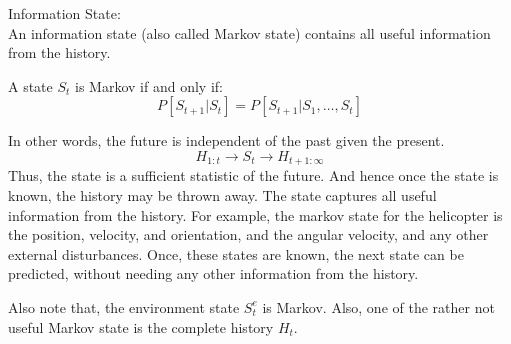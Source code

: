 Information State:\\
An information state (also called Markov state) contains all useful information from the history.
\begin{definition}
    A state \(S_t\) is Markov if and only if:
    \[
        P[S_{t+1} | S_t] = P[S_{t+1} | S_1, \dots, S_t]  
    \]
\end{definition}
In other words, the future is independent of the past given the present.
\[
    H_{1:t} \to S_t \to H_{t+1:\infty}
\]
Thus, the state is a sufficient statistic of the future. And hence once the state is known, the history
may be thrown away. The state captures all useful information from the history.
For example, the markov state for the helicopter is the position, velocity, and orientation, and the
angular velocity, and any other external disturbances. Once, these states are known, the next 
state can be predicted, without needing any other information from the history.

Also note that, the environment state \(S_t^e\) is Markov. Also, one of the rather not useful Markov
state is the complete history \(H_t\).  